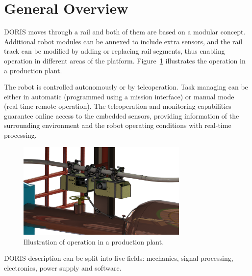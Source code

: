 \documentclass{ifacconf}
\begin{document}
\section{General Overview}\label{sec:general_overview}

DORIS moves through a rail
and both of them are based on a modular concept.
Additional robot modules can be annexed to include extra sensors, and the rail
track can be modified by adding or replacing rail segments, thus enabling
operation in different areas of the platform. Figure~\ref{fig:DORIS-overview}
illustrates the operation in a production plant.

The robot is controlled autonomously or by teleoperation. Task managing
can be either in automatic (programmed using a mission interface) or manual
mode (real-time remote operation). The teleoperation and monitoring
capabilities guarantee online access to the embedded sensors, providing
information of the surrounding environment and the robot operating
conditions with real-time processing.


\begin{figure}[ht]
\centering
\includegraphics[width=8.4cm]{figs/cenario5.png}
\caption{Illustration of operation in a production plant.}
\label{fig:DORIS-overview}
\end{figure}

DORIS description can be split into five fields: mechanics, signal
processing, electronics, power supply and software.

\end{document}
